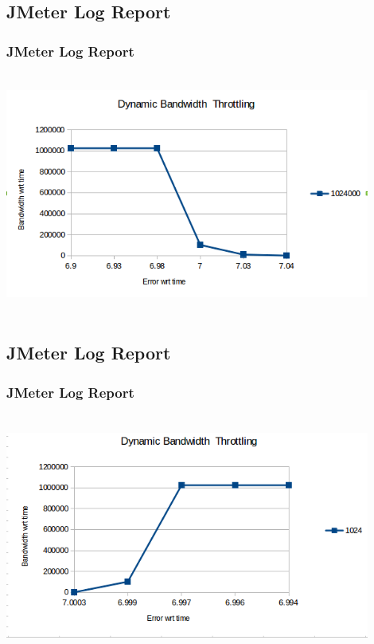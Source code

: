 \documentclass[12pt]{beamer}
\begin{document}
  \subsection{JMeter Log Report}
    \begin{frame}
      \frametitle{JMeter Log Report}
      \includegraphics[width=12cm, height=8cm]{images/dbt6}
      
    \end{frame}
    
    \subsection{JMeter Log Report}
    \begin{frame}
      \frametitle{JMeter Log Report}
      \includegraphics[width=12cm, height=8cm]{images/dbt5}
      
    \end{frame}


\end{document}

